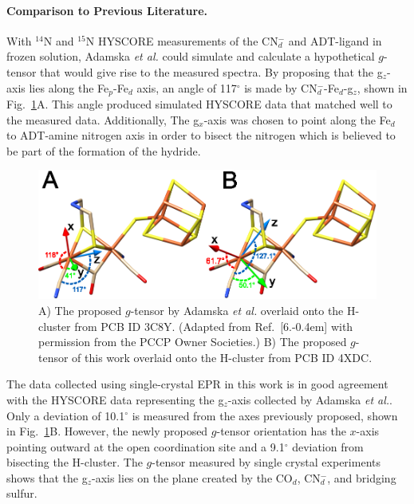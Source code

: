 \paragraph{Comparison to Previous Literature.} With $^{14}$N and $^{15}$N HYSCORE measurements of the CN$_d^-$ and ADT-ligand in frozen solution, Adamska \textit{et al.} could simulate and calculate a hypothetical $g$-tensor that would give rise to the measured spectra. \cite{Adamska2015} By proposing that the g$_z$-axis lies along the Fe$_p$-Fe$_d$ axis, an angle of 117$^\circ$ is made by CN$_d^-$-Fe$_d$-g$_z$, shown in Fig.~\ref{fig:gTensor}A. This angle produced simulated HYSCORE data that matched well to the measured data. Additionally, The g$_x$-axis was chosen to point along the Fe$_d$ to ADT-amine nitrogen axis in order to bisect the nitrogen which is believed to be part of the formation of the hydride.

\begin{figure}[ht]
\centering
\includegraphics{Kapitel/Appendix/Images/S6-gTensorCompare.eps}
\caption[Comparison of the proposed $g$-tensor.]{A) The proposed $g$-tensor by Adamska \textit{et al.} overlaid onto the H-cluster from PCB ID 3C8Y. (Adapted from Ref.~[6.\kern-0.4em] with permission from the PCCP Owner Societies.) B) The proposed $g$-tensor of this work overlaid onto the H-cluster from PCB ID 4XDC.}
\label{fig:gTensor}
\end{figure}

The data collected using single-crystal EPR in this work is in good agreement with the HYSCORE data representing the g$_z$-axis collected by Adamska \textit{et al.}. Only a deviation of 10.1$^{\circ}$ is measured from the axes previously proposed, shown in Fig.~\ref{fig:gTensor}B. However, the newly proposed $g$-tensor orientation has the $x$-axis pointing outward at the open coordination site and a 9.1$^{\circ}$ deviation from bisecting the H-cluster. The $g$-tensor measured by single crystal experiments shows that the g$_z$-axis lies on the plane created by the CO$_d$, CN$_d^-$, and bridging sulfur. 

